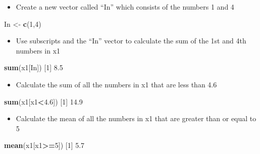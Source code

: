 \documentclass[
]{book}
\newenvironment{Shaded}{\begin{snugshade}}{\end{snugshade}}
\newcommand{\DecValTok}[1]{\textcolor[rgb]{0.00,0.00,0.81}{#1}}
\newcommand{\FloatTok}[1]{\textcolor[rgb]{0.00,0.00,0.81}{#1}}
\newcommand{\KeywordTok}[1]{\textcolor[rgb]{0.13,0.29,0.53}{\textbf{#1}}}
\newcommand{\NormalTok}[1]{#1}
\newcommand{\OperatorTok}[1]{\textcolor[rgb]{0.81,0.36,0.00}{\textbf{#1}}}
\newcommand{\StringTok}[1]{\textcolor[rgb]{0.31,0.60,0.02}{#1}}
\providecommand{\tightlist}{%
  \setlength{\itemsep}{0pt}\setlength{\parskip}{0pt}}
\begin{document}
\begin{itemize}
\tightlist
\item
  Create a new vector called ``In'' which consists of the numbers 1 and 4
\end{itemize}

\begin{Shaded}
\begin{Highlighting}[]
\NormalTok{In <-}\StringTok{ }\KeywordTok{c}\NormalTok{(}\DecValTok{1}\NormalTok{,}\DecValTok{4}\NormalTok{)}
\end{Highlighting}
\end{Shaded}

\begin{itemize}
\tightlist
\item
  Use subscripts and the ``In'' vector to calculate the sum of the 1st and 4th numbers in x1
\end{itemize}

\begin{Shaded}
\begin{Highlighting}[]
\KeywordTok{sum}\NormalTok{(x1[In])}
\NormalTok{[}\DecValTok{1}\NormalTok{] }\FloatTok{8.5}
\end{Highlighting}
\end{Shaded}

\begin{itemize}
\tightlist
\item
  Calculate the sum of all the numbers in x1 that are less than 4.6
\end{itemize}

\begin{Shaded}
\begin{Highlighting}[]
\KeywordTok{sum}\NormalTok{(x1[x1}\OperatorTok{<}\FloatTok{4.6}\NormalTok{])}
\NormalTok{[}\DecValTok{1}\NormalTok{] }\FloatTok{14.9}
\end{Highlighting}
\end{Shaded}

\begin{itemize}
\tightlist
\item
  Calculate the mean of all the numbers in x1 that are greater than or equal to 5
\end{itemize}

\begin{Shaded}
\begin{Highlighting}[]
\KeywordTok{mean}\NormalTok{(x1[x1}\OperatorTok{>=}\DecValTok{5}\NormalTok{])}
\NormalTok{[}\DecValTok{1}\NormalTok{] }\FloatTok{5.7}
\end{Highlighting}
\end{Shaded}
\end{document}
